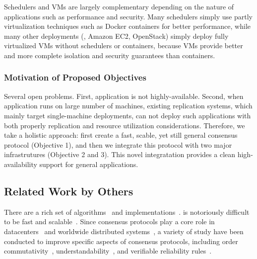 Schedulers and VMs are largely complementary depending on the nature of 
applications such as performance and security. Many schedulers simply use 
partly virtualization techniques such as Docker containers for better 
performance, while many other deployments (\eg, Amazon EC2, OpenStack) simply 
deploy fully virtualized VMs without schedulers or containers, because VMs 
provide better and more complete isolation and security guarantees than 
containers.


\vspace{-.15in}\subsubsection{Motivation of Proposed Objectives} 
\label{sec:motivation}\vspace{-.075in}

Several open problems. First, application is not highly-available. Second, when 
application runs on large number of machines, existing replication systems, 
which mainly target single-machine deployments, can not deploy such 
applications with both properly replication and resource utilization 
considerations. Therefore, we take a holistic approach: first create a fast, 
scable, yet still general consensus protocol (Objective 1), and then we 
integrate this protocol with two major infrastrutures (Objective 2 and 3). This 
novel integratation provides a clean high-availability support for general  
applications.

\vspace{-.15in}\subsection{Related Work by Others} 
 \label{sec:others-work}\vspace{-.075in} 
There are a rich set of
\paxos algorithms~\cite{paxos:practical,paxos,paxos:simple,paxos:complex,
epaxos:sosp13} and 
implementations~\cite{paxos:live,paxos:practical,chubby:osdi,crane:sosp15}. 
\paxos is notoriously difficult to be fast and 
scalable~\cite{ellis:thesis,manos:hotdep10,scatter:sosp11}. Since consensus 
protocols play a core role in datacenters~\cite{matei:hotcloud11, mesos:nsdi11, 
datacenter:os} and worldwide 
distributed systems~\cite{spanner:osdi12,mencius:osdi08}, a variety of study 
have been conducted to improve specific aspects of consensus protocols, 
including order commutativity~\cite{epaxos:sosp13}, 
understandability~\cite{raft:usenix14,paxos}, and verifiable reliability 
rules~\cite{modist:nsdi09,demeter:sosp11}.


